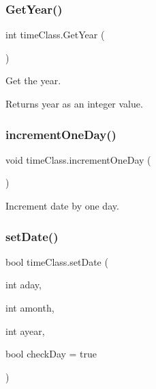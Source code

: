 \subsubsection{\texorpdfstring{GetYear()}{GetYear()}}
{\footnotesize\ttfamily int time\+Class.\+Get\+Year (\begin{DoxyParamCaption}{ }\end{DoxyParamCaption})\hspace{0.3cm}{\ttfamily [inline]}}



Get the year. 

\begin{DoxyReturn}{Returns}
year as an integer value. 
\end{DoxyReturn}
\mbox{\label{classtime_class_af97ba8f356b5f00503596d703d556623}} 
\subsubsection{\texorpdfstring{incrementOneDay()}{incrementOneDay()}}
{\footnotesize\ttfamily void time\+Class.\+increment\+One\+Day (\begin{DoxyParamCaption}{ }\end{DoxyParamCaption})\hspace{0.3cm}{\ttfamily [inline]}}



Increment date by one day. 

\mbox{\label{classtime_class_a2549ae2d02d6ef32bb0afb19d5ddd45d}} 
\subsubsection{\texorpdfstring{setDate()}{setDate()}}
{\footnotesize\ttfamily bool time\+Class.\+set\+Date (\begin{DoxyParamCaption}\item[{int}]{aday,  }\item[{int}]{amonth,  }\item[{int}]{ayear,  }\item[{bool}]{check\+Day = {\ttfamily true} }\end{DoxyParamCaption})\hspace{0.3cm}{\ttfamily [inline]}}



